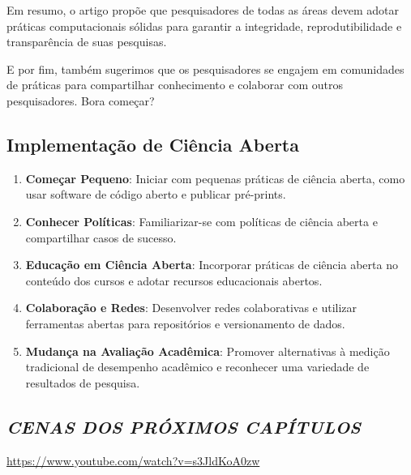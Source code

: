 \documentclass[
  a4paper,
]{article}
\providecommand{\tightlist}{%
  \setlength{\itemsep}{0pt}\setlength{\parskip}{0pt}}\usepackage{longtable,booktabs,array}
\begin{document}
Em resumo, o artigo propõe que pesquisadores de todas as áreas devem
adotar práticas computacionais sólidas para garantir a integridade,
reprodutibilidade e transparência de suas pesquisas.

E por fim, também sugerimos que os pesquisadores se engajem em
comunidades de práticas para compartilhar conhecimento e colaborar com
outros pesquisadores. Bora começar?

\subsection{Implementação de Ciência
Aberta}\label{implementauxe7uxe3o-de-ciuxeancia-aberta}

\begin{enumerate}
\def\labelenumi{\arabic{enumi}.}
\tightlist
\item
  \textbf{Começar Pequeno}: Iniciar com pequenas práticas de ciência
  aberta, como usar software de código aberto e publicar pré-prints.
\item
  \textbf{Conhecer Políticas}: Familiarizar-se com políticas de ciência
  aberta e compartilhar casos de sucesso.
\item
  \textbf{Educação em Ciência Aberta}: Incorporar práticas de ciência
  aberta no conteúdo dos cursos e adotar recursos educacionais abertos.
\item
  \textbf{Colaboração e Redes}: Desenvolver redes colaborativas e
  utilizar ferramentas abertas para repositórios e versionamento de
  dados.
\item
  \textbf{Mudança na Avaliação Acadêmica}: Promover alternativas à
  medição tradicional de desempenho acadêmico e reconhecer uma variedade
  de resultados de pesquisa.
\end{enumerate}

\subsection{\texorpdfstring{\textbf{\emph{CENAS DOS PRÓXIMOS
CAPÍTULOS}}}{CENAS DOS PRÓXIMOS CAPÍTULOS}}\label{cenas-dos-pruxf3ximos-capuxedtulos}

\url{https://www.youtube.com/watch?v=s3JldKoA0zw}
\end{document}
